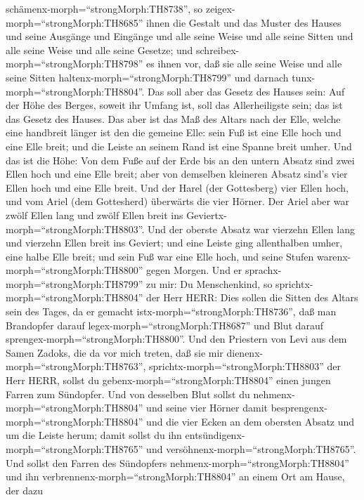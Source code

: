 schämenx-morph=``strongMorph:TH8738'', so
zeigex-morph=``strongMorph:TH8685'' ihnen die Gestalt und das Muster des
Hauses und seine Ausgänge und Eingänge und alle seine Weise und alle
seine Sitten und alle seine Weise und alle seine Gesetze; und
schreibex-morph=``strongMorph:TH8798'' es ihnen vor, daß sie alle seine
Weise und alle seine Sitten haltenx-morph=``strongMorph:TH8799'' und
darnach tunx-morph=``strongMorph:TH8804''.  Das soll aber
das Gesetz des Hauses sein: Auf der Höhe des Berges, soweit ihr Umfang
ist, soll das Allerheiligste sein; das ist das Gesetz des Hauses.
 Das aber ist das Maß des Altars nach der Elle, welche eine
handbreit länger ist den die gemeine Elle: sein Fuß ist eine Elle hoch
und eine Elle breit; und die Leiste an seinem Rand ist eine Spanne breit
umher.  Und das ist die Höhe: Von dem Fuße auf der Erde bis
an den untern Absatz sind zwei Ellen hoch und eine Elle breit; aber von
demselben kleineren Absatz sind's vier Ellen hoch und eine Elle breit.
 Und der Harel (der Gottesberg) vier Ellen hoch, und vom
Ariel (dem Gottesherd) überwärts die vier Hörner.  Der
Ariel aber war zwölf Ellen lang und zwölf Ellen breit ins
Geviertx-morph=``strongMorph:TH8803''.  Und der oberste
Absatz war vierzehn Ellen lang und vierzehn Ellen breit ins Geviert; und
eine Leiste ging allenthalben umher, eine halbe Elle breit; und sein Fuß
war eine Elle hoch, und seine Stufen warenx-morph=``strongMorph:TH8800''
gegen Morgen.  Und er sprachx-morph=``strongMorph:TH8799''
zu mir: Du Menschenkind, so sprichtx-morph=``strongMorph:TH8804'' der
Herr HERR: Dies sollen die Sitten des Altars sein des Tages, da er
gemacht istx-morph=``strongMorph:TH8736'', daß man Brandopfer darauf
legex-morph=``strongMorph:TH8687'' und Blut darauf
sprengex-morph=``strongMorph:TH8800''.  Und den Priestern
von Levi aus dem Samen Zadoks, die da vor mich treten, daß sie mir
dienenx-morph=``strongMorph:TH8763'',
sprichtx-morph=``strongMorph:TH8803'' der Herr HERR, sollst du
gebenx-morph=``strongMorph:TH8804'' einen jungen Farren zum Sündopfer.
 Und von desselben Blut sollst du
nehmenx-morph=``strongMorph:TH8804'' und seine vier Hörner damit
besprengenx-morph=``strongMorph:TH8804'' und die vier Ecken an dem
obersten Absatz und um die Leiste herum; damit sollst du ihn
entsündigenx-morph=``strongMorph:TH8765'' und
versöhnenx-morph=``strongMorph:TH8765''.  Und sollst den
Farren des Sündopfers nehmenx-morph=``strongMorph:TH8804'' und ihn
verbrennenx-morph=``strongMorph:TH8804'' an einem Ort am Hause, der dazu
